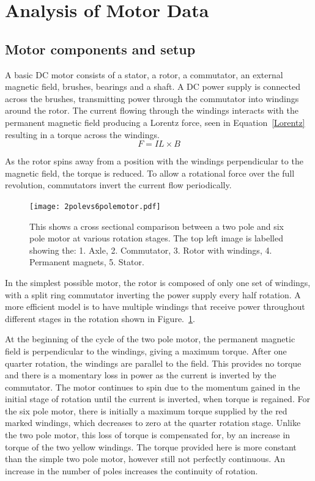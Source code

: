 \section{Analysis of Motor Data}
\label{sec:analysis}

\subsection{Motor components and setup}

A basic DC motor consists of a stator, a rotor, a commutator, an external magnetic field, brushes, bearings and a shaft. A DC power supply is connected across the brushes, transmitting power through the commutator into windings around the rotor. The current flowing through the windings interacts with the permanent magnetic field producing a Lorentz force, seen in Equation~\eqref{Lorentz} resulting in a torque across the windings.
\begin{equation}
    F = I L \times B
    \label{Lorentz}
\end{equation}

As the rotor spins away from a position with the windings perpendicular to the magnetic field, the torque is reduced. To allow a rotational force over the full revolution, commutators invert the current flow periodically. 

\begin{figure}
    \centering
    \texttt{[image: 2polevs6polemotor.pdf]}
    \caption[DC motor cross sectional comparison]{This shows a cross sectional comparison between a two pole and six pole motor at various rotation stages. The top left image is labelled showing the: 1. Axle, 2. Commutator, 3. Rotor with windings, 4. Permanent magnets, 5. Stator.}
    \label{fig:2pole_vs_6pole}
\end{figure}

In the simplest possible motor, the rotor is composed of only one set of windings, with a split ring commutator inverting the power supply every half rotation. A more efficient model is to have multiple windings that receive power throughout different stages in the rotation shown in Figure.~\ref{fig:2pole_vs_6pole}. 

At the beginning of the cycle of the two pole motor, the permanent magnetic field is perpendicular to the windings, giving a maximum torque. After one quarter rotation, the windings are parallel to the field. This provides no torque and there is a momentary loss in power as the current is inverted by the commutator. The motor continues to spin due to the momentum gained in the initial stage of rotation until the current is inverted, when torque is regained. For the six pole motor, there is initially a maximum torque supplied by the red marked windings, which decreases to zero at the quarter rotation stage. Unlike the two pole motor, this loss of torque is compensated for, by an increase in torque of the two yellow windings. The torque provided here is more constant than the simple two pole motor, however still not perfectly continuous. An increase in the number of poles increases the continuity of rotation.

